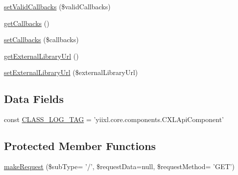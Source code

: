 \begin{DoxyCompactItemize}
\hyperlink{classCXLApiComponent_aa7cb5b977317a087abe048bc7e1883ec}{setValidCallbacks} (\$validCallbacks)
\item 
\hyperlink{classCXLApiComponent_a96c408925a2b86cb73902a2424cd8d78}{getCallbacks} ()
\item 
\hyperlink{classCXLApiComponent_ac401d5471b684c82e84b269542c0f041}{setCallbacks} (\$callbacks)
\item 
\hyperlink{classCXLApiComponent_a008c92d7af501bf1640a88fbc4f4d68e}{getExternalLibraryUrl} ()
\item 
\hyperlink{classCXLApiComponent_a4151f1feb361515462dd299733372171}{setExternalLibraryUrl} (\$externalLibraryUrl)
\end{DoxyCompactItemize}
\subsection*{Data Fields}
\begin{DoxyCompactItemize}
\item 
const \hyperlink{classCXLApiComponent_aa607ab5e557e6ebb60b85c5a20ad067f}{CLASS\_\-LOG\_\-TAG} = 'yiixl.core.components.CXLApiComponent'
\end{DoxyCompactItemize}
\subsection*{Protected Member Functions}
\begin{DoxyCompactItemize}
\item 
\hyperlink{classCXLApiComponent_a6abe5f209ab716aa691b752e6530bd7c}{makeRequest} (\$subType= '/', \$requestData=null, \$requestMethod= 'GET')
\end{DoxyCompactItemize}
